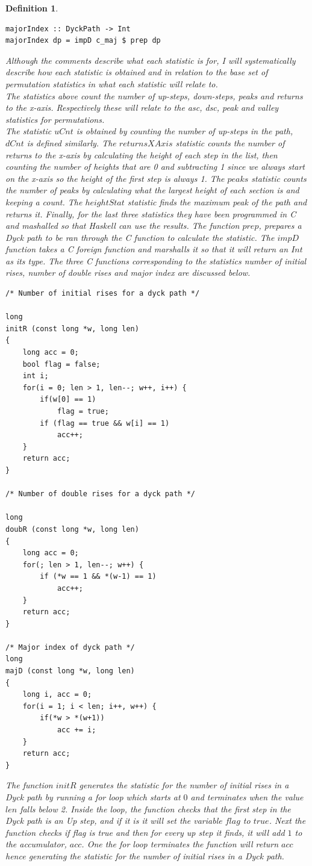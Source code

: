 \documentclass[12pt]{article}
\newtheorem{definition}{Definition}
\begin{document}
\begin{definition}
\begin{lstlisting}
majorIndex :: DyckPath -> Int
majorIndex dp = impD c_maj $ prep dp
\end{lstlisting}
Although the comments describe what each statistic is for, I will systematically describe how each statistic is obtained and in relation to the base set of permutation statistics in \cite{Clae01} what each statistic will relate to.\\
The statistics above count the number of up-steps, down-steps, peaks and returns to the x-axis. Respectively these will relate to the asc, dsc, peak and valley statistics for permutations.\\
The statistic $uCnt$ is obtained by counting the number of up-steps in the path, $dCnt$ is defined similarly. The $returnsXAxis$ statistic counts the number of returns to the x-axis by calculating the height of each step in the list, then counting the number of heights that are 0 and subtracting 1 since we always start on the x-axis so the height of the first step is always 1. The $peaks$ statistic counts the number of peaks by calculating what the largest height of each section is and keeping a count. The $heightStat$ statistic finds the maximum peak of the path and returns it. Finally, for the last three statistics they have been programmed in C and mashalled so that Haskell can use the results. The function $prep$, prepares a Dyck path to be ran through the C function to calculate the statistic. The $impD$ function takes a C foreign function and marshalls it so that it will return an $Int$ as its type. The three C functions corresponding to the statistics number of initial rises, number of double rises and major index are discussed below.\\
\begin{lstlisting}
/* Number of initial rises for a dyck path */

long
initR (const long *w, long len)
{
	long acc = 0;
	bool flag = false;
	int i;	
	for(i = 0; len > 1, len--; w++, i++) {
		if(w[0] == 1)
			flag = true;		
		if (flag == true && w[i] == 1)
			acc++;
	}
	return acc;
}

/* Number of double rises for a dyck path */

long
doubR (const long *w, long len)
{
	long acc = 0;
	for(; len > 1, len--; w++) {
		if (*w == 1 && *(w-1) == 1)
			acc++;
	}
	return acc;
}

/* Major index of dyck path */
long
majD (const long *w, long len)
{
	long i, acc = 0;
	for(i = 1; i < len; i++, w++) {
		if(*w > *(w+1))
			acc += i;
	}
	return acc;
}
\end{lstlisting}
The function $initR$ generates the statistic for the number of initial rises in a Dyck path by running a for loop which starts at $0$ and terminates when the value $len$ falls below 2. Inside the loop, the function checks that the first step in the Dyck path is an Up step, and if it is it will set the variable $flag$ to $true$. Next the function checks if flag is true and then for every up step it finds, it will add $1$ to the accumulator, $acc$. One the for loop terminates the function will return $acc$ hence generating the statistic for the number of initial rises in a Dyck path.\\


\end{definition}
\end{document}
